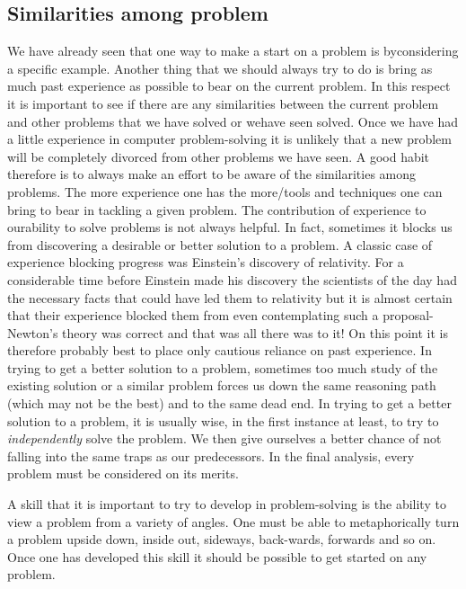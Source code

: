 \documentclass{book}
\begin{document}
\subsection{Similarities among problem}
We have already seen that one way to make a start on a problem is byconsidering a specific example. Another thing that we should always try to do is bring as much past experience as possible to bear on the current problem. In this respect it is important to see if there are any similarities between the current problem and other problems that we have solved or wehave seen solved. Once we have had a little experience in computer problem-solving it is unlikely that a new problem will be completely divorced from other problems we have seen. A good habit therefore is to always make an effort to be aware of the similarities among problems. The more experience one has the more/tools and techniques one can bring to bear in tackling a given problem. The contribution of experience to ourability to solve problems is not always helpful. In fact, sometimes it blocks us from discovering a desirable or better solution to a problem. A classic case of experience blocking progress was Einstein's discovery of relativity. For a considerable time before Einstein made his discovery the scientists of the day had the necessary facts that could have led them to relativity but it is almost certain that their experience blocked them from even contemplating such a proposal-Newton's theory was correct and that was all there was to it! On this point it is therefore probably best to place only cautious reliance on past experience. In trying to get a better solution to a problem, sometimes too much study of the existing solution or a similar problem forces us down the same reasoning path (which may not be the best) and to the same dead end. In trying to get a better solution to a problem, it is usually wise, in the first instance at least, to try to \textit{independently} solve the problem. We then give ourselves a better chance of not falling into the same traps as our predecessors. In the final analysis, every problem must be considered on its merits.\par
	A skill that it is important to try to develop in problem-solving is the ability to view a problem from a variety of angles. One must be able to metaphorically turn a problem upside down, inside out, sideways, back-wards, forwards and so on. Once one has developed this skill it should be possible to get started on any problem.
\end{document}
